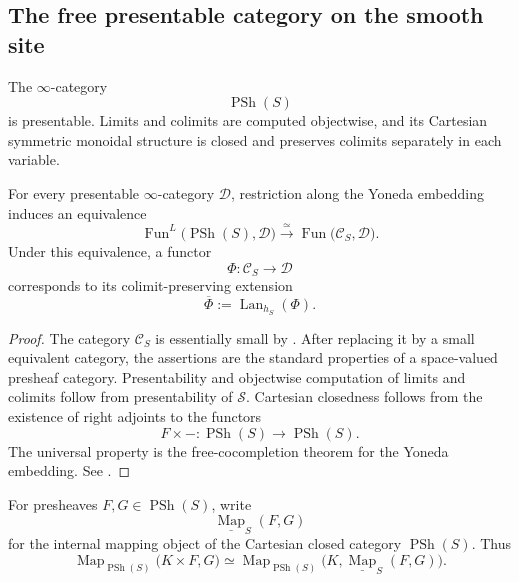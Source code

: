 \subsection{The free presentable category on the smooth site}

\begin{proposition}
\label{prop:motivic-presheaf-free-cocompletion}
The \(\infty\)-category
\[
    \operatorname{PSh}(S)
\]
is presentable.  Limits and colimits are computed objectwise, and its
Cartesian symmetric monoidal structure is closed and preserves colimits
separately in each variable.

For every presentable \(\infty\)-category \(\mathcal D\), restriction
along the Yoneda embedding induces an equivalence
\[
    \operatorname{Fun}^{L}
    \bigl(
        \operatorname{PSh}(S),
        \mathcal D
    \bigr)
    \xrightarrow{\simeq}
    \operatorname{Fun}
    \bigl(
        \mathcal C_S,
        \mathcal D
    \bigr).
\]
Under this equivalence, a functor
\[
    \Phi
    \colon
    \mathcal C_S
    \longrightarrow
    \mathcal D
\]
corresponds to its colimit-preserving extension
\[
    \overline\Phi
    :=
    \operatorname{Lan}_{h_S}(\Phi).
\]
\end{proposition}

\begin{proof}
The category \(\mathcal C_S\) is essentially small by
.  After replacing it by a small
equivalent category, the assertions are the standard properties of a
space-valued presheaf category.  Presentability and objectwise
computation of limits and colimits follow from presentability of
\(\mathcal S\).  Cartesian closedness follows from the existence of
right adjoints to the functors
\[
    F\times -
    \colon
    \operatorname{PSh}(S)
    \longrightarrow
    \operatorname{PSh}(S).
\]
The universal property is the free-cocompletion theorem for the Yoneda
embedding.  See \cite{LurieHTT,LurieHA}.
\end{proof}

\begin{notation}
\label{not:motivic-internal-map}
For presheaves \(F,G\in\operatorname{PSh}(S)\), write
\[
    \underline{\operatorname{Map}}_S(F,G)
\]
for the internal mapping object of the Cartesian closed category
\(\operatorname{PSh}(S)\).  Thus
\[
    \operatorname{Map}_{\operatorname{PSh}(S)}
    \bigl(
        K\times F,
        G
    \bigr)
    \simeq
    \operatorname{Map}_{\operatorname{PSh}(S)}
    \bigl(
        K,
        \underline{\operatorname{Map}}_S(F,G)
    \bigr).
\]
\end{notation}

